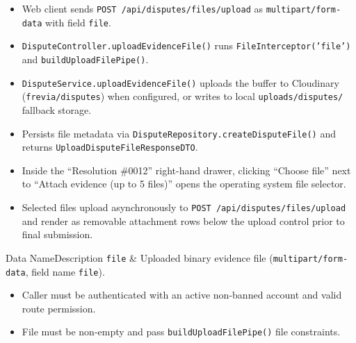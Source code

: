 \begin{itemize}[leftmargin=1.6em,topsep=3pt,itemsep=2pt,parsep=0pt,label=$\bullet$]
      \item Web client sends \texttt{POST /api/disputes/files/upload} as \texttt{multipart/form-data} with field \texttt{file}.
      \item \texttt{DisputeController.uploadEvidenceFile()} runs \texttt{FileInterceptor('file')} and \texttt{buildUploadFilePipe()}.
      \item \texttt{DisputeService.uploadEvidenceFile()} uploads the buffer to Cloudinary (\texttt{frevia/disputes}) when configured, or writes to local \texttt{uploads/disputes/} fallback storage.
      \item Persists file metadata via \texttt{DisputeRepository.createDisputeFile()} and returns \texttt{UploadDisputeFileResponseDTO}.
\end{itemize}

\begin{itemize}[leftmargin=1.6em,topsep=3pt,itemsep=2pt,parsep=0pt,label=$\bullet$]
      \item Inside the ``Resolution \#0012'' right-hand drawer, clicking ``Choose file'' next to ``Attach evidence (up to 5 files)'' opens the operating system file selector.
      \item Selected files upload asynchronously to \texttt{POST /api/disputes/files/upload} and render as removable attachment rows below the upload control prior to final submission.
\end{itemize}


\begin{specdatatable}{Data Name}{Description}
      \texttt{file} & Uploaded binary evidence file (\texttt{multipart/form-data}, field name \texttt{file}).\\ \hline
\end{specdatatable}

\begin{itemize}[leftmargin=1.6em,topsep=3pt,itemsep=2pt,parsep=0pt,label=$\bullet$]
      \item Caller must be authenticated with an active non-banned account and valid route permission.
      \item File must be non-empty and pass \texttt{buildUploadFilePipe()} file constraints.
\end{itemize}


